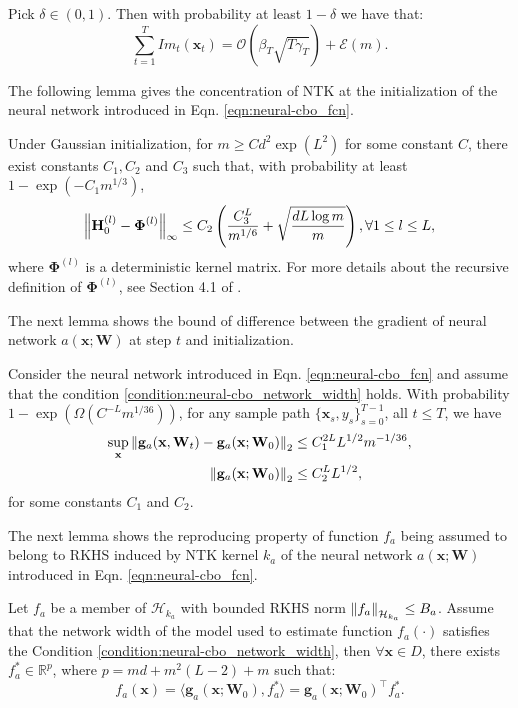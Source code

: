 \begin{auxlemma}
\label{lemma:neural_cbo_improvement_f}
    Pick $\delta \in (0, 1)$. Then with probability at least $1 - \delta$ we have that:
    \[ \sum_{t=1}^T {Im}_t (\mathbf{x}_t) = \mathcal{O}(\beta_T \sqrt{T\gamma_T} ) + \mathcal{E}(m). \]
\end{auxlemma}

The following lemma gives the concentration of NTK at the initialization of the neural network introduced in Eqn. \eqref{eqn:neural-cbo_fcn}.
\begin{auxlemma}
\label{lemma:neural_cbo_H_to_Phi}
Under Gaussian initialization, for $m \ge Cd^2 \exp(L^2)$ for some constant $C$, there exist constants $C_1, C_2$ and $C_3$ such that, with probability at least $1 - \exp (-C_1 m^{1/3})$,
\[
\norm{\mathbf{H}^{(l)}_0 - \boldsymbol{\Phi}^{(l)}}_\infty \le C_2 \left(\frac{C_3^L}{m^{1/6}} + \sqrt{\frac{dL\log m}{m}}\right), \forall 1\le l \le L,
\]
where $\boldsymbol{\Phi}^{(l)}$ is a deterministic kernel matrix. For more details about the recursive definition of $\boldsymbol{\Phi}^{(l)}$, see Section 4.1 of \citet{xu2024overparametrized}.
\end{auxlemma}

The next lemma shows the bound of difference between the gradient of neural network $a(\mathbf{x}; \mathbf{W})$ at step $t$ and initialization.
\begin{auxlemma} Consider the neural network introduced in Eqn. \eqref{eqn:neural-cbo_fcn} and assume that the condition \ref{condition:neural-cbo_network_width} holds. With probability $1 - \exp (\Omega(C^{-L} m^{1/36}))$, for any sample path $\{ \mathbf{x}_s, y_s\}_{s=0}^{T-1}$, all $t\le T$, we have
\begin{align*}
\begin{split}
    \sup_\mathbf{x} \norm{\mathbf{g}_{a} (\mathbf{x}, \mathbf{W}_t) - \mathbf{g}_{a}(\mathbf{x}; \mathbf{W}_0)}_2 & \le C_1^{2L} L^{1/2}m^{-1/36},
    \\
    \norm{\mathbf{g}_{a}(\mathbf{x}; \mathbf{W}_0)}_2 &\le C_2^L L^{1/2}  ,
\end{split}    
\end{align*}
for some constants $C_1$ and $C_2$. 
\end{auxlemma}
The next lemma shows the reproducing property of function $f_a$ being assumed to belong to RKHS induced by NTK kernel $k_a$ of the neural network $a(\mathbf{x}; \mathbf{W})$ introduced in Eqn. \eqref{eqn:neural-cbo_fcn}.
\begin{auxlemma}
    \label{lemma:neural_cbo_RKHS_expression}
    Let $f_a$ be a member of $\mathcal{H}_{k_a}$ with bounded RKHS norm $\norm{f_a}_{\mathcal{H}_{k_a}} \le B_a$. Assume that the network width of the model used to estimate function $f_a (\cdot)$ satisfies the Condition \ref{condition:neural-cbo_network_width}, 
    then $\forall \mathbf{x} \in D$, there exists $f_a^* \in \mathbb{R}^p$, where $p=md+m^2(L-2)+m$ such that:
    \[
    f_a(\mathbf{x}) = \langle \mathbf{g}_a(\mathbf{x}; \mathbf{W}_0), f_a^* \rangle = \mathbf{g}_a(\mathbf{x}; \mathbf{W}_0)^\top f_a^*.
    \]
\end{auxlemma}

